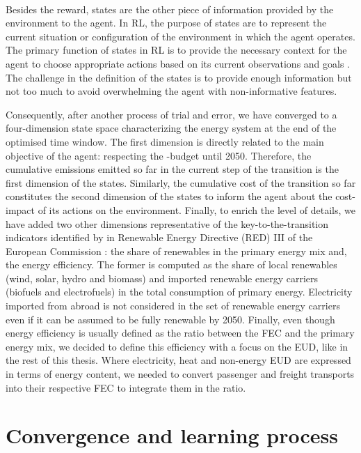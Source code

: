 \\

\noindent
Besides the reward, states are the other piece of information provided by the environment to the agent. In \gls{RL}, the purpose of states are to represent the current situation or configuration of the environment in which the agent operates. The primary function of states in RL is to provide the necessary context for the agent to choose appropriate actions based on its current observations and goals \cite{sutton2018reinforcement}. The challenge in the definition of the states is to provide enough information but not too much to avoid overwhelming the agent with non-informative features. 

Consequently, after another process of trial and error, we have converged to a four-dimension state space characterizing the energy system at the end of the optimised time window. The first dimension is directly related to the main objective of the agent: respecting the -budget until 2050. Therefore, the cumulative emissions emitted so far in the current step of the transition is the first dimension of the states. Similarly, the cumulative cost of the transition so far constitutes the second dimension of the states to inform the agent about the cost-impact of its actions on the environment. Finally, to enrich the level of details, we have added two other dimensions representative of the key-to-the-transition indicators identified by in Renewable Energy Directive (RED) III of the European Commission \cite{REDIII}: the share of renewables in the primary energy mix and, the energy efficiency. The former is computed as the share of local renewables (\ie wind, solar, hydro and biomass) and imported renewable energy carriers (\ie biofuels and electrofuels) in the total consumption of primary energy. Electricity imported from abroad is not considered in the set of renewable energy carriers even if it can be assumed to be fully renewable by 2050. Finally, even though energy efficiency is usually defined as the ratio between the \gls{FEC} and the primary energy mix, we decided to define this efficiency with a focus on the \gls{EUD}, like in the rest of this thesis. Where electricity, heat and non-energy \gls{EUD} are expressed in terms of energy content, we needed to convert passenger and freight transports into their respective \gls{FEC} to integrate them in the ratio. 

\section{Convergence and learning process}
\label{sec:RL:learning}

